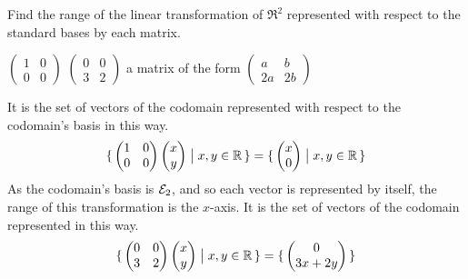 \begin{exercises}
\begin{answer}
    \end{answer}
  \item 
    Find the range of the linear transformation of \( \Re^2 \) represented
    with respect to the standard bases by each matrix.
    \begin{exparts*}
      \partsitem $\begin{pmatrix}
            1  &0 \\
            0  &0
          \end{pmatrix}$
      \partsitem $\begin{pmatrix}
          0  &0  \\
          3  &2  
        \end{pmatrix}$
      \partsitem a matrix of the form 
        $\begin{pmatrix}
            a   &b  \\
            2a  &2b
          \end{pmatrix}$
    \end{exparts*}
    \begin{answer}
      \begin{exparts}
        \partsitem It is the set of vectors of the codomain represented with
          respect to the codomain's basis in this way.
          \begin{equation*}
            \mbox{$\{\,
              \begin{pmatrix}
                1  &0  \\
                0  &0
              \end{pmatrix}
              \begin{pmatrix} x  \\ y \end{pmatrix}
              \bigm| x,y\in\mathbb{R}\,\}$}
            =\mbox{$\{\,\begin{pmatrix} x  \\ 0 \end{pmatrix}
                  \bigm| x,y\in\mathbb{R}\,\}$}
          \end{equation*}
          As the codomain's basis is ${\cal E}_2$, 
          and so each vector is represented
          by itself, the range of this transformation is the $x$-axis.
        \partsitem It is the set of vectors of the codomain represented
          in this way.
          \begin{equation*}
            \mbox{$\{\,
              \begin{pmatrix}
                0  &0  \\
                3  &2
              \end{pmatrix}
              \begin{pmatrix} x  \\ y \end{pmatrix}
              \bigm| x,y\in\mathbb{R}\,\}$}
            =\mbox{$\{\,\begin{pmatrix} 0  \\ 3x+2y \end{pmatrix}
\,\}$}
\end{equation*}
\end{exparts}
\end{answer}
\end{exercises}
